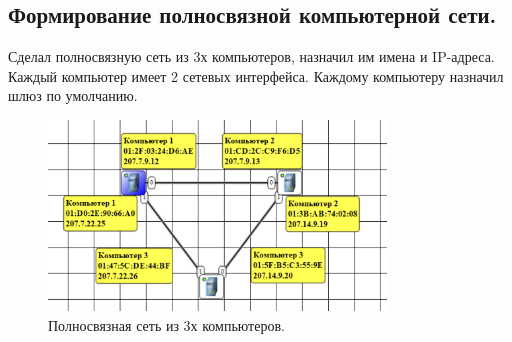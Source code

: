 \documentclass[12pt,onecolumn]{article}
\begin{document}
\subsection{Формирование полносвязной компьютерной сети.}
Сделал полносвязную сеть из 3х компьютеров, назначил им имена и IP-адреса.
Каждый компьютер имеет 2 сетевых интерфейса.
Каждому компьютеру назначил шлюз по умолчанию.
\begin{figure}[H]
  \centering
  \includegraphics[width=0.8\textwidth]{image/part3/topology.png}
  \caption{Полносвязная сеть из 3х компьютеров.}
\end{figure}
\end{document}

